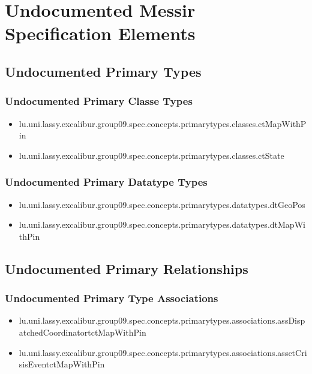 	
\chapter{Undocumented Messir Specification Elements}











\section[Undocumented Primary Types]{Undocumented Primary Types}

\subsection[Undocumented Primary Classe Types]{Undocumented Primary Classe Types}
\begin{itemize}
\item lu.uni.lassy.excalibur.group09.spec.concepts.primarytypes.classes.ctMapWithPin 
\item lu.uni.lassy.excalibur.group09.spec.concepts.primarytypes.classes.ctState 
\end{itemize}

\subsection[Undocumented Primary Datatype Types]{Undocumented Primary Datatype Types}
\begin{itemize}
\item lu.uni.lassy.excalibur.group09.spec.concepts.primarytypes.datatypes.dtGeoPos 
\item lu.uni.lassy.excalibur.group09.spec.concepts.primarytypes.datatypes.dtMapWithPin 
\end{itemize}







\section[Undocumented Primary Type Relationships]{Undocumented Primary Relationships}

\subsection[Undocumented Primary Type Associations]{Undocumented Primary Type Associations}
\begin{itemize}
\item lu.uni.lassy.excalibur.group09.spec.concepts.primarytypes.associations.assDispatchedCoordinatortctMapWithPin 
\item lu.uni.lassy.excalibur.group09.spec.concepts.primarytypes.associations.assctCrisisEventctMapWithPin 
\end{itemize}









